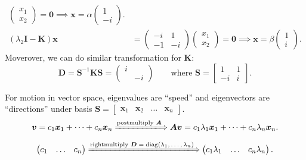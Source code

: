 \begin{example}
\begin{align*}
\begin{pmatrix}
x_1\\x_2
\end{pmatrix}=\bm 0\implies\bm x=\alpha\begin{pmatrix}
1\\-i
\end{pmatrix}.\\
(\lambda_2\bm I-\bm K)\bm x&=\begin{pmatrix}
-i&1\\-1&-i
\end{pmatrix}\begin{pmatrix}
x_1\\x_2
\end{pmatrix}=\bm 0\implies\bm x=\beta\begin{pmatrix}
1\\i
\end{pmatrix}.
\end{align*}
Moverover, we can do similar transformation for $\bm K$:
\[
\bm D=\bm S^{-1}\bm K\bm S=\begin{pmatrix}
i&\\&-i
\end{pmatrix}\qquad\text{where $\bm S=\begin{bmatrix}
1&1\\-i&i
\end{bmatrix}$.}
\]
\end{example}
\begin{remark}
For motion in vector space, eigenvalues are ``speed''
 and eigenvectors are ``directions'' under basis $\bm S=\begin{bmatrix}
\bm x_1&\bm x_2&\dots&\bm x_n
\end{bmatrix}$.
\[
\bm v=c_1\bm x_1+\dots+c_n\bm x_n
\xLongrightarrow{\text{postmultiply $\bm A$}}\bm{Av}=c_1\lambda_1\bm x_1+\dots+c_n\lambda_n\bm x_n.
\]
\[
\begin{pmatrix}
c_1&\dots&c_n
\end{pmatrix}
\xLongrightarrow{\text{rightmultiply $\bm D=\diag(\lambda_1,\dots,\lambda_n)$}}
\begin{pmatrix}c_1\lambda_1&\dots&c_n\lambda_n
\end{pmatrix}.
\]
\end{remark}
